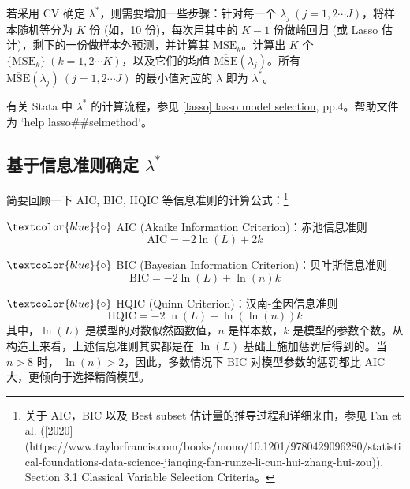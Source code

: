 若采用 CV 确定 $\lambda^*$，则需要增加一些步骤：针对每一个 $\lambda_j\ (j=1,2\cdots J)$，将样本随机等分为 $K$ 份 (如，10 份)，每次用其中的 $K-1$ 份做岭回归 (或 Lasso 估计)，剩下的一份做样本外预测，并计算其 $\mathrm{MSE}_k$。计算出 $K$ 个 $\{\mathrm{MSE}_k\}\ (k=1,2\cdots K)$，以及它们的均值 $\overline{\mathrm{MSE}}(\lambda_j)$。所有 $\overline{\mathrm{MSE}}(\lambda_j)\ (j=1,2\cdots J)$ 的最小值对应的 $\lambda$ 即为 $\lambda^*$。

有关 Stata 中 $\lambda^*$ 的计算流程，参见 \href{https://www.stata.com/manuals/lassolasso.pdf}{[lasso] lasso model selection}, pp.4。帮助文件为 `help lasso\#\#selmethod`。



\subsection{基于信息准则确定 $\lambda^*$}\label{sec:lasso-lambda-ic}

简要回顾一下 AIC, BIC, HQIC 等信息准则的计算公式：\footnote{%
   关于 AIC，BIC 以及 Best subset 估计量的推导过程和详细来由，参见 Fan et al. ([2020](https://www.taylorfrancis.com/books/mono/10.1201/9780429096280/statistical-foundations-data-science-jianqing-fan-runze-li-cun-hui-zhang-hui-zou)), Section 3.1 Classical Variable Selection Criteria。%
}

$\textcolor{blue}{\circ}$ AIC (Akaike Information Criterion)：赤池信息准则
$$\mathrm{AIC} = -2 \ln(L) + 2 k$$

$\textcolor{blue}{\circ}$ BIC (Bayesian Information Criterion)：贝叶斯信息准则
$$\mathrm{BIC}=-2 \ln(L) + \ln(n)k$$

$\textcolor{blue}{\circ}$ HQIC (Quinn Criterion)：汉南-奎因信息准则
$$\mathrm{HQIC}=-2 \ln(L) + \ln(\ln(n))k$$
其中，$\ln(L)$ 是模型的对数似然函数值，$n$ 是样本数，$k$ 是模型的参数个数。从构造上来看，上述信息准则其实都是在 $\ln(L)$ 基础上施加惩罚后得到的。当 $n>8$ 时， $\ln(n)>2$，因此，多数情况下 BIC 对模型参数的惩罚都比 AIC 大，更倾向于选择精简模型。

